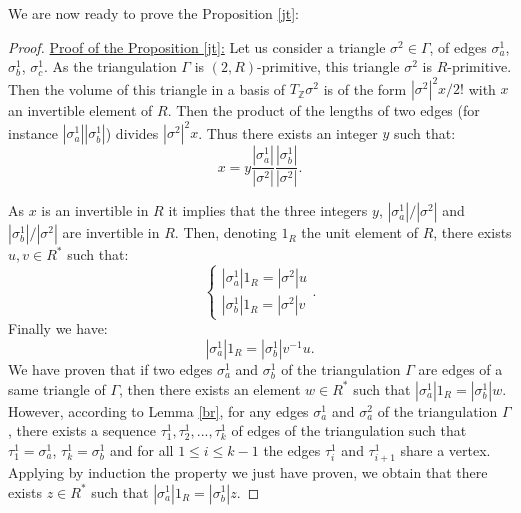 \documentclass{article}
\begin{document}
We are now ready to prove the Proposition \ref{jt}:

\begin{proof}
    \underline{Proof of the Proposition \ref{jt}:}
    Let us consider a triangle $\sigma^2\in\Gamma$, of edges $\sigma^1_a$, $\sigma^1_b$, $\sigma^1_c$. As the triangulation $\Gamma$ is $(2,R)$-primitive, this triangle $\sigma^2$ is $R$-primitive. Then the volume of this triangle in a basis of $T_{\mathbb{Z}}\sigma^2$ is of the form $|\sigma^2|^2x/2!$ with $x$ an invertible element of $R$. Then the product of the lengths of two edges (for instance $|\sigma^1_a|| \sigma^1_b|$) divides $|\sigma^2|^2x$. Thus there exists an integer $y$ such that:
    \begin{equation*}
        x=y\frac{|\sigma^1_a|}{|\sigma^2|}\frac{|\sigma^1_b|}{|\sigma^2|}.
    \end{equation*}

    As $x$ is an invertible in $R$ it implies that the three integers $y$, ${|\sigma^1_a|/|\sigma^2|}$ and $|\sigma^1_b|/|\sigma^2|$ are invertible in $R$. Then, denoting $1_R$ the unit element of $R$, there exists $u,v\in R^*$ such that:
    \begin{equation*}
        \left \{ \begin{array}{l}
            |\sigma^1_a|1_R=|\sigma^2|u \\
            |\sigma^1_b|1_R=|\sigma^2|v
        \end{array} \right . .
    \end{equation*}
    Finally we have:
    \begin{equation*}
        |\sigma^1_a|1_R=|\sigma^1_b|v^{-1}u.
    \end{equation*}
    We have proven that if two edges $\sigma^1_a$ and $\sigma^1_b$ of the triangulation $\Gamma$ are edges of a same triangle of $\Gamma$, then there exists an element $w\in R^*$ such that $|\sigma^1_a|1_R=|\sigma^1_b|w$. However, according to Lemma \ref{br}, for any edges $\sigma_a^1$ and $\sigma_a^2$ of the triangulation $\Gamma$, there exists a sequence $\tau^1_1,\tau^1_2,...,\tau^1_k$ of edges of the triangulation such that $\tau^1_1=\sigma^1_a$, $\tau^1_k=\sigma^1_b$ and for all $1\leq i \leq k-1$ the edges $\tau^1_i$ and $\tau^1_{i+1}$ share a vertex. Applying by induction the property we just have proven, we obtain that there exists $z\in R^*$ such that $|\sigma^1_a|1_R=|\sigma^1_b|z$.


\end{proof}
\end{document}
